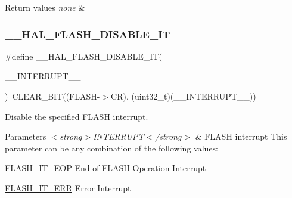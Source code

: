 \begin{DoxyRetVals}{Return values}
{\em none} & \\
\hline
\end{DoxyRetVals}
\mbox{\label{group___f_l_a_s_h___interrupt_ga1f40f507b5d4b3a4da68e4244a1097ee}} 
\subsubsection{\texorpdfstring{\+\_\+\+\_\+\+H\+A\+L\+\_\+\+F\+L\+A\+S\+H\+\_\+\+D\+I\+S\+A\+B\+L\+E\+\_\+\+IT}{\_\_HAL\_FLASH\_DISABLE\_IT}}
{\footnotesize\ttfamily \#define \+\_\+\+\_\+\+H\+A\+L\+\_\+\+F\+L\+A\+S\+H\+\_\+\+D\+I\+S\+A\+B\+L\+E\+\_\+\+IT(\begin{DoxyParamCaption}\item[{}]{\+\_\+\+\_\+\+I\+N\+T\+E\+R\+R\+U\+P\+T\+\_\+\+\_\+ }\end{DoxyParamCaption})~C\+L\+E\+A\+R\+\_\+\+B\+IT((F\+L\+A\+SH-\/$>$CR), (uint32\+\_\+t)(\+\_\+\+\_\+\+I\+N\+T\+E\+R\+R\+U\+P\+T\+\_\+\+\_\+))}



Disable the specified F\+L\+A\+SH interrupt. 


\begin{DoxyParams}{Parameters}
{\em $<$strong$>$\+I\+N\+T\+E\+R\+R\+U\+P\+T$<$/strong$>$} & F\+L\+A\+SH interrupt This parameter can be any combination of the following values\+: \begin{DoxyItemize}
\item \hyperlink{group___f_l_a_s_h___interrupt__definition_gaea20e80e1806d58a7544cfe8659e7f11}{F\+L\+A\+S\+H\+\_\+\+I\+T\+\_\+\+E\+OP} End of F\+L\+A\+SH Operation Interrupt \item \hyperlink{group___f_l_a_s_h___interrupt__definition_ga4e2c23ab8c1b9a5ee49bf6d695d9ae8c}{F\+L\+A\+S\+H\+\_\+\+I\+T\+\_\+\+E\+RR} Error Interrupt \end{DoxyItemize}
\\
\hline
\end{DoxyParams}

